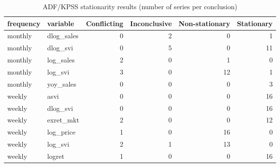 \begin{table}[t]
\scriptsize
\centering
\caption{ADF/KPSS stationarity results (number of series per conclusion)}
\label{tab:stationarity}
\begin{tabular}{llrrrr}
\toprule
frequency & variable & Conflicting & Inconclusive & Non-stationary & Stationary \\
\midrule
monthly & dlog\_sales & 0 & 2 & 0 & 1 \\
monthly & dlog\_svi & 0 & 5 & 0 & 11 \\
monthly & log\_sales & 2 & 0 & 1 & 0 \\
monthly & log\_svi & 3 & 0 & 12 & 1 \\
monthly & yoy\_sales & 0 & 0 & 0 & 3 \\
weekly & asvi & 0 & 0 & 0 & 16 \\
weekly & dlog\_svi & 0 & 0 & 0 & 16 \\
weekly & exret\_mkt & 2 & 0 & 0 & 12 \\
weekly & log\_price & 1 & 0 & 16 & 0 \\
weekly & log\_svi & 2 & 1 & 13 & 0 \\
weekly & logret & 1 & 0 & 0 & 16 \\
\bottomrule
\end{tabular}
\end{table}
